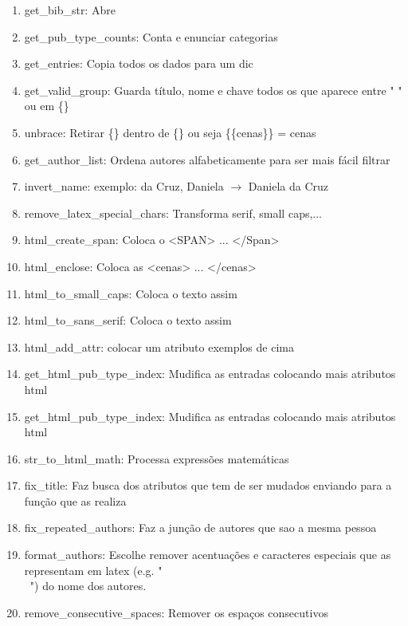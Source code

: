 \documentclass[11pt,a4paper]{report}
\begin{document}
\begin{enumerate}[label=\textbf{L\arabic*}]
    \item \label{L1}get\_bib\_str: Abre \bib
    \item \label{L2}get\_pub\_type\_counts: Conta e enunciar categorias
    \item \label{L3}get\_entries: Copia todos os dados \bib para um dic
    \item \label{L4}get\_valid\_group: Guarda título, nome e chave todos os que aparece entre " " ou em \{\}
    \item \label{L5}unbrace: Retirar \{\} dentro de \{\} ou seja \{\{cenas\}\} = cenas
    \item \label{L6}get\_author\_list: Ordena autores alfabeticamente para ser mais fácil filtrar
    \item \label{L7}invert\_name: exemplo: da Cruz, Daniela $\rightarrow$ Daniela da Cruz
    \item \label{L8}remove\_latex\_special\_chars: Transforma serif, small caps,... 
    \item \label{L9}html\_create\_span: Coloca o <SPAN> ... </Span>
    \item \label{L10}html\_enclose:  Coloca as <cenas> ... </cenas>
    \item \label{L11}html\_to\_small\_caps: Coloca o texto assim
    \item \label{L12}html\_to\_sans\_serif: Coloca o texto assim
    \item \label{L13}html\_add\_attr: colocar um atributo exemplos de cima
    \item \label{L14}get\_html\_pub\_type\_index: Mudifica as entradas colocando mais atributos html
    \item \label{L15}get\_html\_pub\_type\_index: Mudifica as entradas colocando mais atributos html
    \item \label{L16}str\_to\_html\_math: Processa expressões matemáticas
    \item \label{L17}fix\_title: Faz busca dos atributos que tem de ser mudados enviando para a função que as realiza
    \item \label{L18}fix\_repeated\_authors: Faz a junção de autores que sao a mesma pessoa
    \item \label{L19}format\_authors: Escolhe remover acentuações e caracteres especiais  que as representam em latex (e.g. "\\~") do nome dos autores.
    \item \label{L20}remove\_consecutive\_spaces: Remover os espaços consecutivos 

\end{enumerate}
\end{document}

